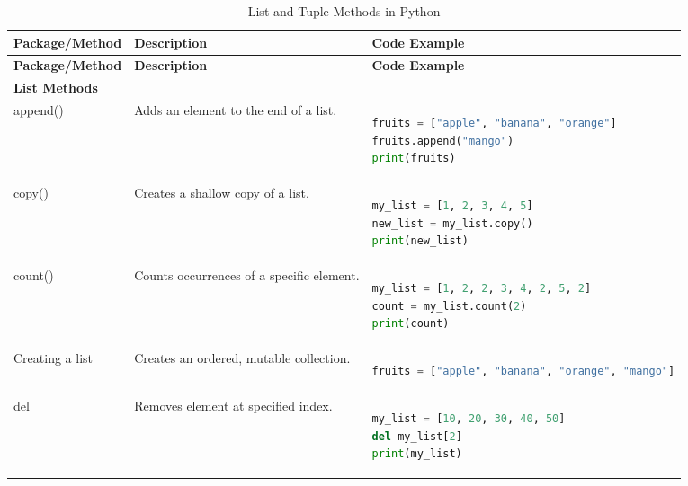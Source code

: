 \documentclass[../../data_analysis_python.tex]{subfiles}
\begin{document}
    \begin{longtable}{p{} p{} p{}}
    \toprule
    \textbf{Package/Method} & \textbf{Description} & \textbf{Code Example} \\
    \midrule
    \endfirsthead
    
    \toprule
    \textbf{Package/Method} & \textbf{Description} & \textbf{Code Example} \\
    \midrule
    \endhead
    
    \bottomrule
    \caption{List and Tuple Methods in Python}
    \label{tab:list_tuple_methods}
    \endlastfoot
    
    \textbf{List Methods} & & \\
    \hline
    
    append() & Adds an element to the end of a list. & 
    \begin{lstlisting}[language=Python]
fruits = ["apple", "banana", "orange"]
fruits.append("mango")
print(fruits)
    \end{lstlisting} \\
    \hline
    
    copy() & Creates a shallow copy of a list. & 
    \begin{lstlisting}[language=Python]
my_list = [1, 2, 3, 4, 5]
new_list = my_list.copy()
print(new_list)
    \end{lstlisting} \\
    \hline
    
    count() & Counts occurrences of a specific element. & 
    \begin{lstlisting}[language=Python]
my_list = [1, 2, 2, 3, 4, 2, 5, 2]
count = my_list.count(2)
print(count)
    \end{lstlisting} \\
    \hline
    
    Creating a list & Creates an ordered, mutable collection. & 
    \begin{lstlisting}[language=Python]
fruits = ["apple", "banana", "orange", "mango"]
    \end{lstlisting} \\
    \hline
    
    del & Removes element at specified index. & 
    \begin{lstlisting}[language=Python]
my_list = [10, 20, 30, 40, 50]
del my_list[2]
print(my_list)
    \end{lstlisting} \\
    \hline
    

\end{longtable}
\end{document}
